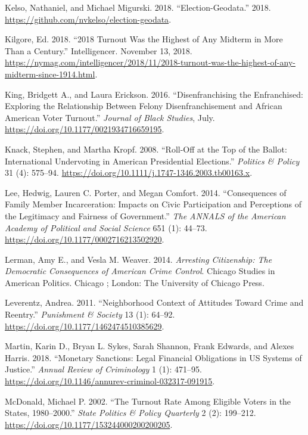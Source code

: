 \documentclass[
  12pt,
]{article}
\newlength{\cslhangindent}
\newenvironment{cslreferences}%
  {\setlength{\parindent}{0pt}%
  \everypar{\setlength{\hangindent}{\cslhangindent}}\ignorespaces}%
  {\par}
\begin{document}
\begin{cslreferences}
\leavevmode\hypertarget{ref-Kelso2018}{}%
Kelso, Nathaniel, and Michael Migurski. 2018. ``Election-Geodata.'' 2018. \url{https://github.com/nvkelso/election-geodata}.

\leavevmode\hypertarget{ref-Kilgore2018}{}%
Kilgore, Ed. 2018. ``2018 Turnout Was the Highest of Any Midterm in More Than a Century.'' Intelligencer. November 13, 2018. \url{https://nymag.com/intelligencer/2018/11/2018-turnout-was-the-highest-of-any-midterm-since-1914.html}.

\leavevmode\hypertarget{ref-King2016}{}%
King, Bridgett A., and Laura Erickson. 2016. ``Disenfranchising the Enfranchised: Exploring the Relationship Between Felony Disenfranchisement and African American Voter Turnout.'' \emph{Journal of Black Studies}, July. \url{https://doi.org/10.1177/0021934716659195}.

\leavevmode\hypertarget{ref-Knack2008}{}%
Knack, Stephen, and Martha Kropf. 2008. ``Roll-Off at the Top of the Ballot: International Undervoting in American Presidential Elections.'' \emph{Politics \& Policy} 31 (4): 575--94. \url{https://doi.org/10.1111/j.1747-1346.2003.tb00163.x}.

\leavevmode\hypertarget{ref-Lee2014}{}%
Lee, Hedwig, Lauren C. Porter, and Megan Comfort. 2014. ``Consequences of Family Member Incarceration: Impacts on Civic Participation and Perceptions of the Legitimacy and Fairness of Government.'' \emph{The ANNALS of the American Academy of Political and Social Science} 651 (1): 44--73. \url{https://doi.org/10.1177/0002716213502920}.

\leavevmode\hypertarget{ref-Lerman2014}{}%
Lerman, Amy E., and Vesla M. Weaver. 2014. \emph{Arresting Citizenship: The Democratic Consequences of American Crime Control}. Chicago Studies in American Politics. Chicago ; London: The University of Chicago Press.

\leavevmode\hypertarget{ref-Leverentz2011}{}%
Leverentz, Andrea. 2011. ``Neighborhood Context of Attitudes Toward Crime and Reentry.'' \emph{Punishment \& Society} 13 (1): 64--92. \url{https://doi.org/10.1177/1462474510385629}.

\leavevmode\hypertarget{ref-Martin2018}{}%
Martin, Karin D., Bryan L. Sykes, Sarah Shannon, Frank Edwards, and Alexes Harris. 2018. ``Monetary Sanctions: Legal Financial Obligations in US Systems of Justice.'' \emph{Annual Review of Criminology} 1 (1): 471--95. \url{https://doi.org/10.1146/annurev-criminol-032317-091915}.

\leavevmode\hypertarget{ref-McDonald2002}{}%
McDonald, Michael P. 2002. ``The Turnout Rate Among Eligible Voters in the States, 1980--2000.'' \emph{State Politics \& Policy Quarterly} 2 (2): 199--212. \url{https://doi.org/10.1177/153244000200200205}.


\end{cslreferences}
\end{document}
